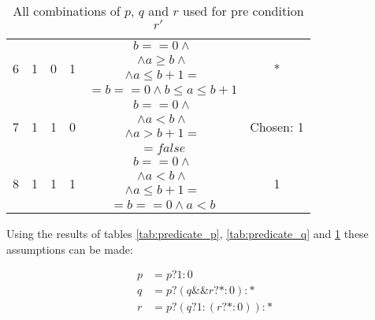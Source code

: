 \begin{table}
\begin{tabular}{ | c | c | c | c | c | c | }
    \multirow{4}{*}{6} & \multirow{4}{*}{1} & \multirow{4}{*}{0} & \multirow{4}{*}{1} & $b == 0 \land $ & \multirow{4}{*}{*} \\
    & & & & $\land a \ge b \land$ & \\
    & & & & $\land a \le b + 1 =$ & \\
    & & & & $= b == 0 \land b \le a \le b + 1$ & \\ \hline

    \multirow{4}{*}{7} & \multirow{4}{*}{1} & \multirow{4}{*}{1} & \multirow{4}{*}{0} & $b == 0 \land $ & \multirow{4}{*}{Chosen: 1} \\
    & & & & $\land a < b \land$ & \\
    & & & & $\land a > b + 1 =$ & \\
    & & & & $= false$ & \\ \hline

    \multirow{4}{*}{8} & \multirow{4}{*}{1} & \multirow{4}{*}{1} & \multirow{4}{*}{1} & $b == 0 \land $ & \multirow{4}{*}{1} \\
    & & & & $\land a < b \land$ & \\
    & & & & $\land a \le b + 1 =$ & \\
    & & & & $= b == 0 \land a < b$ & \\ \hline
  \end{tabular}
  \caption{All combinations of $p$, $q$ and $r$ used for pre condition $r'$}
  \label{tab:predicate_r}
\end{table}

Using the results of tables \ref{tab:predicate_p}, \ref{tab:predicate_q} and \ref{tab:predicate_r} these assumptions can be made:

\begin{equation}
\begin{array}{rl}
p &= p ? 1 : 0\\
q &= p ? (q \&\& r ? * : 0) : *\\
r &= p ? (q ? 1 : (r ? * : 0)) : *\\
\end{array}
\end{equation}

